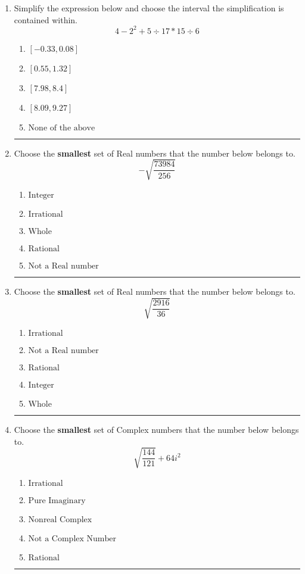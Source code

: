 \documentclass[14pt]{extbook}
\newcommand{\litem}[1]{\item#1\hspace*{-1cm}\rule{\textwidth}{0.4pt}}
\begin{document}
\begin{enumerate}
{\begin{enumerate}[label=\Alph*.]
\end{enumerate} }
\litem{
Simplify the expression below and choose the interval the simplification is contained within.\[ 4 - 2^2 + 5 \div 17 * 15 \div 6 \]\begin{enumerate}[label=\Alph*.]
\item \( [-0.33, 0.08] \)
\item \( [0.55, 1.32] \)
\item \( [7.98, 8.4] \)
\item \( [8.09, 9.27] \)
\item \( \text{None of the above} \)

\end{enumerate} }
\litem{
Choose the \textbf{smallest} set of Real numbers that the number below belongs to.\[ -\sqrt{\frac{73984}{256}} \]\begin{enumerate}[label=\Alph*.]
\item \( \text{Integer} \)
\item \( \text{Irrational} \)
\item \( \text{Whole} \)
\item \( \text{Rational} \)
\item \( \text{Not a Real number} \)

\end{enumerate} }
\litem{
Choose the \textbf{smallest} set of Real numbers that the number below belongs to.\[ \sqrt{\frac{2916}{36}} \]\begin{enumerate}[label=\Alph*.]
\item \( \text{Irrational} \)
\item \( \text{Not a Real number} \)
\item \( \text{Rational} \)
\item \( \text{Integer} \)
\item \( \text{Whole} \)

\end{enumerate} }
\litem{
Choose the \textbf{smallest} set of Complex numbers that the number below belongs to.\[ \sqrt{\frac{144}{121}} + 64i^2 \]\begin{enumerate}[label=\Alph*.]
\item \( \text{Irrational} \)
\item \( \text{Pure Imaginary} \)
\item \( \text{Nonreal Complex} \)
\item \( \text{Not a Complex Number} \)
\item \( \text{Rational} \)


\end{enumerate}}
\end{enumerate}
\end{document}
